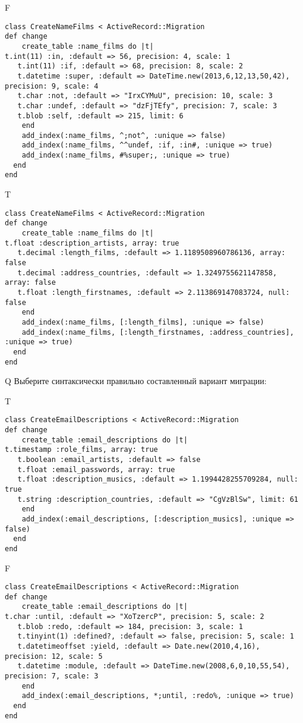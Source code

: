 F
\begin{verbatim}
class CreateNameFilms < ActiveRecord::Migration
def change
	create_table :name_films do |t|
t.int(11) :in, :default => 56, precision: 4, scale: 1
   t.int(11) :if, :default => 68, precision: 8, scale: 2
   t.datetime :super, :default => DateTime.new(2013,6,12,13,50,42), precision: 9, scale: 4
   t.char :not, :default => "IrxCYMuU", precision: 10, scale: 3
   t.char :undef, :default => "dzFjTEfy", precision: 7, scale: 3
   t.blob :self, :default => 215, limit: 6
   	end
	add_index(:name_films, ^;not^, :unique => false)
 	add_index(:name_films, ^^undef, :if, :in#, :unique => true)
 	add_index(:name_films, #%super;, :unique => true)
  end 
end

\end{verbatim}

T
\begin{verbatim}
class CreateNameFilms < ActiveRecord::Migration
def change
	create_table :name_films do |t|
t.float :description_artists, array: true
   t.decimal :length_films, :default => 1.1189508960786136, array: false
   t.decimal :address_countries, :default => 1.3249755621147858, array: false
   t.float :length_firstnames, :default => 2.113869147083724, null: false
   	end
	add_index(:name_films, [:length_films], :unique => false)
 	add_index(:name_films, [:length_firstnames, :address_countries], :unique => true)
  end 
end

\end{verbatim}

Q
Выберите синтаксически правильно составленный вариант миграции:

T
\begin{verbatim}
class CreateEmailDescriptions < ActiveRecord::Migration
def change
	create_table :email_descriptions do |t|
t.timestamp :role_films, array: true
   t.boolean :email_artists, :default => false
   t.float :email_passwords, array: true
   t.float :description_musics, :default => 1.1994428255709284, null: true
   t.string :description_countries, :default => "CgVzBlSw", limit: 61
   	end
	add_index(:email_descriptions, [:description_musics], :unique => false)
  end 
end

\end{verbatim}

F
\begin{verbatim}
class CreateEmailDescriptions < ActiveRecord::Migration
def change
	create_table :email_descriptions do |t|
t.char :until, :default => "XoTzercP", precision: 5, scale: 2
   t.blob :redo, :default => 184, precision: 3, scale: 1
   t.tinyint(1) :defined?, :default => false, precision: 5, scale: 1
   t.datetimeoffset :yield, :default => Date.new(2010,4,16), precision: 12, scale: 5
   t.datetime :module, :default => DateTime.new(2008,6,0,10,55,54), precision: 7, scale: 3
   	end
	add_index(:email_descriptions, *;until, :redo%, :unique => true)
  end 
end

\end{verbatim}

